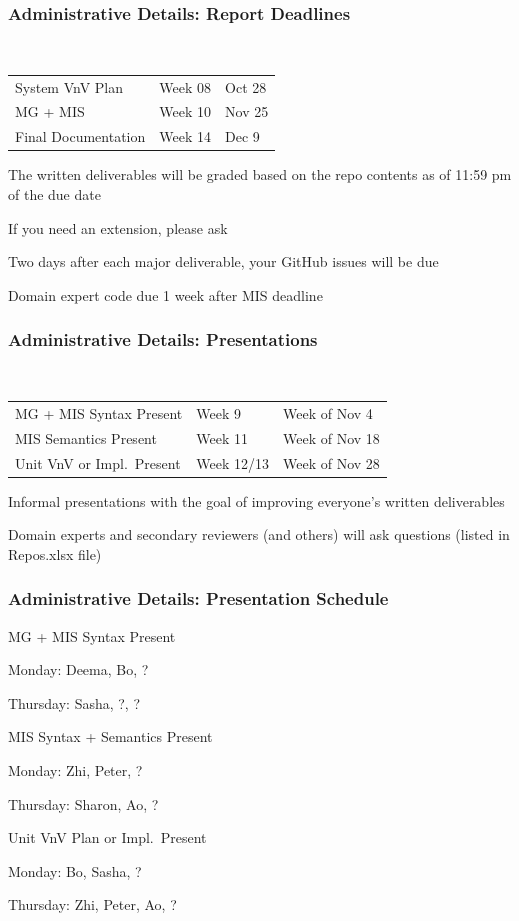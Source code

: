 \documentclass[t,12pt,numbers,fleqn]{beamer}
\begin{document}
\begin{frame}
\frametitle{Administrative Details: Report Deadlines}
~\newline
\begin{tabular}{l l l}
System VnV Plan & Week 08 & Oct 28\\
MG + MIS & Week 10 & Nov 25\\
Final Documentation & Week 14 & Dec 9\\
\end {tabular}

\bi
\item The written deliverables will be graded based on the repo contents as of
11:59 pm of the due date
\item If you need an extension, please ask
\item Two days after each major deliverable, your GitHub issues will be due
\item Domain expert code due 1 week after MIS deadline
\ei

\end{frame}


\begin{frame}
\frametitle{Administrative Details: Presentations}

~\newline
\begin{tabular}{l l l}
MG + MIS Syntax Present & Week 9 & Week of Nov 4\\
MIS Semantics Present & Week 11 & Week of Nov 18\\
Unit VnV or Impl.\ Present & Week 12/13 & Week of Nov 28\\
\end {tabular}

\bi
\item Informal presentations with the goal of improving everyone's written
  deliverables
\item Domain experts and secondary reviewers (and others) will ask questions
  (listed in Repos.xlsx file)
\ei

\end{frame}


\begin{frame}
\frametitle{Administrative Details: Presentation Schedule}

\bi
\item MG + MIS Syntax Present
\bi
\item Monday:  Deema, Bo, ?
\item Thursday: Sasha, ?, ?
\ei
\item MIS Syntax + Semantics Present
\bi
\item Monday: Zhi, Peter, ?
\item Thursday:  Sharon, Ao, ?
\ei
\item Unit VnV Plan or Impl.\ Present
\bi
\item Monday: Bo, Sasha, ?
\item Thursday: Zhi, Peter, Ao, ?
\ei
\ei

\end{frame}
\end{document}
